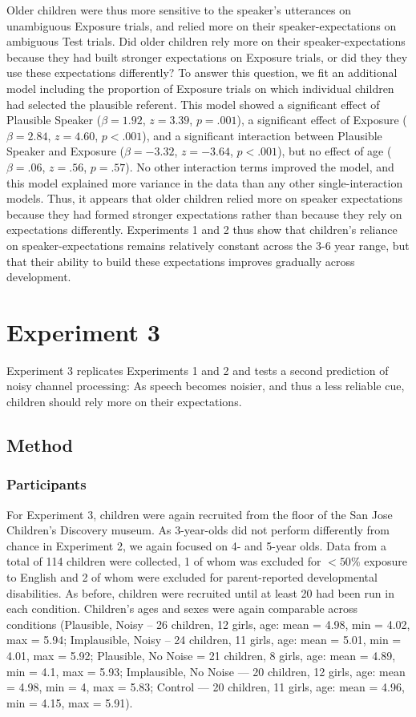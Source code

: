 \documentclass[man,floatsintext]{apa6}
\begin{document}
Older children were thus more sensitive to the speaker's utterances on unambiguous Exposure trials, and relied more on their speaker-expectations on ambiguous Test trials. Did older children rely more on their speaker-expectations because they had built stronger expectations on Exposure trials, or did they they use these expectations differently? To answer this question, we fit an additional model including the proportion of Exposure trials on which individual children had selected the plausible referent. This model showed a significant effect of Plausible Speaker ($\beta = 1.92$, $z = 3.39$, $p = .001$), a significant effect of Exposure ($\beta = 2.84$, $z = 4.60$, $p < .001$), and a significant interaction between Plausible Speaker and Exposure ($\beta = -3.32$, $z = -3.64$, $p < .001$), but no effect of age ($\beta = .06$, $z = .56$, $p = .57$). No other interaction terms improved the model, and this model explained more variance in the data than any other single-interaction models. Thus, it appears that older children relied more on speaker expectations because they had formed stronger expectations rather than because they rely on expectations differently. Experiments 1 and 2 thus show that children's reliance on speaker-expectations remains relatively constant across the 3-6 year range, but that their ability to build these expectations improves gradually across development.


\section{Experiment 3}

Experiment 3 replicates Experiments 1 and 2 and tests a second prediction of noisy channel processing: As speech becomes noisier, and thus a less reliable cue, children should rely more on their expectations.

\subsection{Method}

\subsubsection{Participants}

For Experiment 3, children were again recruited from the floor of the San Jose Children's Discovery museum. As 3-year-olds did not perform differently from chance in Experiment 2, we again focused on 4- and 5-year olds. Data from a total of 114 children were collected, 1 of whom was excluded for $<50\%$ exposure to English and 2 of whom were excluded for parent-reported developmental disabilities. As before, children were recruited until at least 20 had been run in each condition. Children's ages and sexes were again comparable across conditions (Plausible, Noisy -- 26 children, 12 girls, age: mean = 4.98, min = 4.02, max = 5.94; Implausible, Noisy -- 24 children, 11 girls, age: mean = 5.01, min = 4.01, max = 5.92; Plausible, No Noise = 21 children, 8 girls, age: mean = 4.89, min = 4.1, max = 5.93; Implausible, No Noise --- 20 children, 12 girls, age: mean = 4.98, min = 4, max = 5.83; Control --- 20 children, 11 girls, age: mean = 4.96, min = 4.15, max = 5.91).
\end{document}
